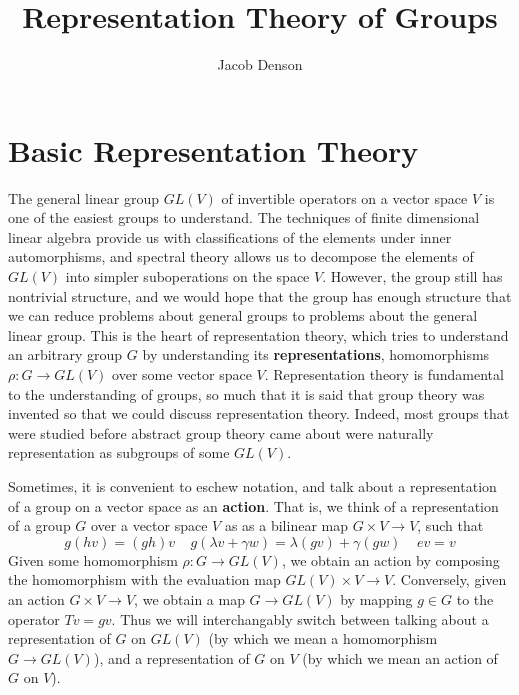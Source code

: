 

\title{Representation Theory of Groups}
\author{Jacob Denson}




\maketitle

\tableofcontents


\chapter{Basic Representation Theory}

The general linear group $GL(V)$ of invertible operators on a vector space $V$ is one of the easiest groups to understand. The techniques of finite dimensional linear algebra provide us with classifications of the elements under inner automorphisms, and spectral theory allows us to decompose the elements of $GL(V)$ into simpler suboperations on the space $V$. However, the group still has nontrivial structure, and we would hope that the group has enough structure that we can reduce problems about general groups to problems about the general linear group. This is the heart of representation theory, which tries to understand an arbitrary group $G$ by understanding its {\bf representations}, homomorphisms $\rho: G \to GL(V)$ over some vector space $V$. Representation theory is fundamental to the understanding of groups, so much that it is said that group theory was invented so that we could discuss representation theory. Indeed, most groups that were studied before abstract group theory came about were naturally representation as subgroups of some $GL(V)$.

Sometimes, it is convenient to eschew notation, and talk about a representation of a group on a vector space as an {\bf action}. That is, we think of a representation of a group $G$ over a vector space $V$ as as a bilinear map $G \times V \to V$, such that
%
\[ g(hv) = (gh)v\ \ \ \ \ g( \lambda v + \gamma w) = \lambda (gv) + \gamma (gw)\ \ \ \ \ ev = v \]
%
Given some homomorphism $\rho: G \to GL(V)$, we obtain an action by composing the homomorphism with the evaluation map $GL(V) \times V \to V$. Conversely, given an action $G \times V \to V$, we obtain a map $G \to GL(V)$ by mapping $g \in G$ to the operator $Tv = gv$. Thus we will interchangably switch between talking about a representation of $G$ on $GL(V)$ (by which we mean a homomorphism $G \to GL(V)$), and a representation of $G$ on $V$ (by which we mean an action of $G$ on $V$).

